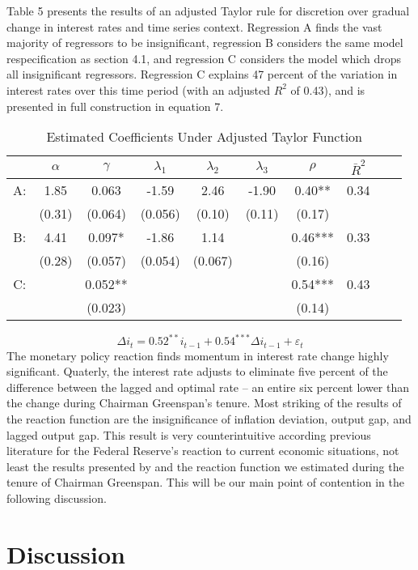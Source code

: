 \documentclass[notitlepage,12pt]{article}
\begin{document}
Table 5 presents the results of an adjusted Taylor rule for discretion over gradual change in interest rates and time series context.  Regression A finds the vast majority of regressors to be insignificant, regression B considers the same model respecification as section 4.1, and regression C considers the model which drops all insignificant regressors. Regression C explains 47 percent of the variation in interest rates over this time period (with an adjusted $R^2$ of 0.43), and is presented in full construction in equation 7.
\begin{table}[H]
\caption{Estimated Coefficients Under Adjusted Taylor Function}
\centering
\begin{tabular}{ccccccc|ccc}
&$\alpha$ & $\gamma$ & $\lambda_1$ & $\lambda_2$& $\lambda_3$&$\rho $&${\bar R}^2$ \\
\toprule
A:&  1.85&0.063 &-1.59 & 2.46&-1.90 &0.40** & 0.34\\
& (0.31)&(0.064)&(0.056)&(0.10)&(0.11)&(0.17)&\\ \midrule
B:& 4.41 & 0.097*&-1.86 &1.14 & &0.46*** & 0.33\\
& (0.28)&(0.057)&(0.054)&(0.067)& &(0.16)&\\ \midrule
C:&&0.052**&&&&0.54***& 0.43 \\
&  &(0.023)&&&&(0.14)& \\
\midrule
\bottomrule
\end{tabular}
\end{table}
\begin{equation}
\Delta i_t = 0.52^{**} i_{t-1} + 0.54^{***} \Delta i_{t-1} +\varepsilon_t 
\end{equation}
The monetary policy reaction finds momentum in interest rate change highly significant.  Quaterly, the interest rate adjusts to eliminate five percent of the difference between the lagged and optimal rate -- an entire six percent lower than the change during Chairman Greenspan's tenure.  Most striking of the results of the reaction function are the insignificance of inflation deviation, output gap, and lagged output gap.  This result is very counterintuitive according previous literature for the Federal Reserve's reaction to current economic situations, not least the results presented by \cite{judd1998taylor} and the reaction function we estimated during the tenure of Chairman Greenspan.  This will be our main point of contention in the following discussion. 
\section{Discussion}
\end{document}
